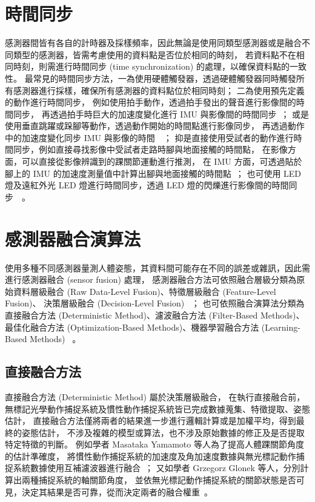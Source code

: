 \section{時間同步}
感測器間皆有各自的計時器及採樣頻率，因此無論是使用同類型感測器或是融合不同類型的感測器，皆需考慮使用的資料點是否位於相同的時刻，
若資料點不在相同時刻，則需進行時間同步 (time synchronization) 的處理，以確保資料點的一致性。
最常見的時間同步方法，一為使用硬體觸發器，透過硬體觸發器同時觸發所有感測器進行採樣，確保所有感測器的資料點位於相同時刻；
二為使用預先定義的動作進行時間同步，
例如使用拍手動作，透過拍手發出的聲音進行影像間的時間同步，
再透過拍手時巨大的加速度變化進行 IMU 與影像間的時間同步~\cite{pons2012data}；
或是使用垂直跳躍或跺腳等動作，透過動作開始的時間點進行影像同步，
再透過動作中的加速度變化同步 IMU 與影像的時間~\cite{destelle2014low}~\cite{Trumble:BMVC:2017}；
抑是直接使用受試者的動作進行時間同步，例如直接尋找影像中受試者走路時腳與地面接觸的時間點，
在影像方面，可以直接從影像辨識到的踝關節運動進行推測，
在 IMU 方面，可透過貼於腳上的 IMU 的加速度測量值中計算出腳與地面接觸的時間點~\cite{kaichi2020resolving}；
也可使用 LED 燈及遠紅外光 LED 燈進行時間同步，透過 LED 燈的閃爍進行影像間的時間同步~\cite{nakano2020evaluation}~\cite{needham2021accuracy}。

\section{感測器融合演算法}
使用多種不同感測器量測人體姿態，其資料間可能存在不同的誤差或雜訊，因此需進行感測器融合 (sensor fusion) 處理，
感測器融合方法可依照融合層級分類為原始資料層級融合 (Raw Data-Level Fusion)、特徵層級融合 (Feature-Level Fusion)、
決策層級融合 (Decision-Level Fusion) ~\cite{majumder2020vision}；
也可依照融合演算法分類為直接融合方法 (Deterministic Method)、濾波融合方法 (Filter-Based Methods)、
最佳化融合方法 (Optimization-Based Methods)、機器學習融合方法 (Learning-Based Methods) ~\cite{li2023visual}。


\subsection*{直接融合方法}
直接融合方法 (Deterministic Method) 屬於決策層級融合，
在執行直接融合前，無標記光學動作捕捉系統及慣性動作捕捉系統皆已完成數據蒐集、特徵提取、姿態估計，
直接融合方法僅將兩者的結果進一步進行邏輯計算或是加權平均，得到最終的姿態估計，
不涉及複雜的模型或算法，也不涉及原始數據的修正及是否提取特定特徵的判斷。
例如學者 Masataka Yamamoto 等人為了提高人體踝關節角度的估計準確度，
將慣性動作捕捉系統的加速度及角加速度數據與無光標記動作捕捉系統數據使用互補濾波器進行融合~\cite{yamamoto2022verification}；
又如學者 Grzegorz Glonek 等人，分別計算出兩種捕捉系統的軸關節角度，
並依無光標記動作捕捉系統的關節狀態是否可見，決定其結果是否可靠，從而決定兩者的融合權重~\cite{s17122857}。

